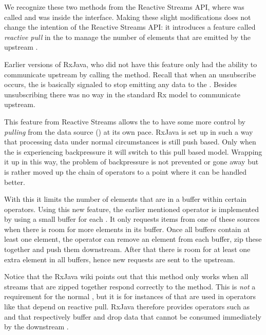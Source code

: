 We recognize these two methods from the Reactive Streams API, where  was called  and  was inside the  interface. Making these slight modifications does not change the intention of the Reactive Streams API: it introduces a feature called \textit{reactive pull} in the \obv to manage the number of elements that are emitted by the upstream \obs.

Earlier versions of RxJava, who did not have this feature only had the ability to communicate upstream by calling the  method. Recall that when an unsubscribe occurs, the \obs is basically signaled to stop emitting any data to the \obv. Besides unsubscribing there was no way in the standard Rx model to communicate upstream.

This feature from Reactive Streams allows the \obv to have some more control by \emph{pulling} from the data source (\obs) at its own pace. RxJava is set up in such a way that processing data under normal circumstances is still push based. Only when the \obv is experiencing backpressure it will switch to this pull based model. Wrapping it up in this way, the problem of backpressure is not prevented or gone away but is rather moved up the chain of operators to a point where it can be handled better. 

With this it limits the number of elements that are in a buffer within certain operators. Using this new feature, the earlier mentioned  operator is implemented by using a small buffer for each \obs. It only requests items from one of these sources when there is room for more elements in its buffer. Once all buffers contain at least one element, the operator can remove an element from each buffer, zip these together and push them downstream. After that there is room for at least one extra element in all buffers, hence new requests are sent to the upstream.

Notice that the RxJava wiki  points out that this method only works when all streams that are zipped together respond correctly to the  method. This is \emph{not} a requirement for the normal \obs, but it is for instances of \obs that are used in operators like  that depend on reactive pull. RxJava therefore provides operators such as  and  that respectively buffer and drop data that cannot be consumed immediately by the downstream \obv.










